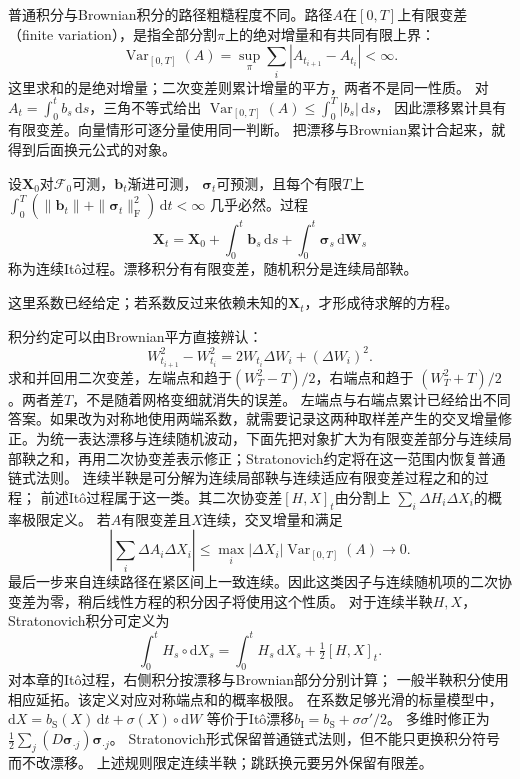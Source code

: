 普通积分与Brownian积分的路径粗糙程度不同。路径$A$在$[0,T]$上有限变差
（finite variation），是指全部分割$\pi$上的绝对增量和有共同有限上界：
\[
 \operatorname{Var}_{[0,T]}(A)
 =\sup_\pi\sum_i|A_{t_{i+1}}-A_{t_i}|<\infty.
\]
这里求和的是绝对增量；二次变差则累计增量的平方，两者不是同一性质。
对$A_t=\int_0^t b_s\,\mathrm ds$，三角不等式给出
$\operatorname{Var}_{[0,T]}(A)\leq\int_0^T|b_s|\,\mathrm ds$，
因此漂移累计具有有限变差。向量情形可逐分量使用同一判断。
把漂移与Brownian累计合起来，就得到后面换元公式的对象。
\begin{definition}[连续Itô过程]
  \label{def:action-state-ito-process}
  设$\bm X_0$对$\mathcal F_0$可测，$\bm b_t$渐进可测，
  $\bm\sigma_t$可预测，且每个有限$T$上
  $\int_0^T(\|\bm b_t\|+\|\bm\sigma_t\|_{\mathrm F}^2)\,\mathrm dt<\infty$
  几乎必然。过程
  \[
    \bm X_t=\bm X_0+\int_0^t\bm b_s\,\mathrm ds
                         +\int_0^t\bm\sigma_s\,\mathrm d\bm W_s
  \]
  称为连续Itô过程。漂移积分有有限变差，随机积分是连续局部鞅。
\end{definition}
这里系数已经给定；若系数反过来依赖未知的$\bm X_t$，才形成待求解的方程。

积分约定可以由Brownian平方直接辨认：
\[
 W_{t_{i+1}}^2-W_{t_i}^2
     =2W_{t_i}\Delta W_i+(\Delta W_i)^2.
\]
求和并回用二次变差，左端点和趋于$(W_T^2-T)/2$，右端点和趋于
$(W_T^2+T)/2$。两者差$T$，不是随着网格变细就消失的误差。
左端点与右端点累计已经给出不同答案。如果改为对称地使用两端系数，就需要记录这两种取样差产生的交叉增量修正。为统一表达漂移与连续随机波动，下面先把对象扩大为有限变差部分与连续局部鞅之和，再用二次协变差表示修正；Stratonovich约定将在这一范围内恢复普通链式法则。
连续半鞅是可分解为连续局部鞅与连续适应有限变差过程之和的过程；
前述Itô过程属于这一类。其二次协变差$[H,X]_t$由分割上
$\sum_i\Delta H_i\Delta X_i$的概率极限定义。
若$A$有限变差且$X$连续，交叉增量和满足
\[
 \left|\sum_i\Delta A_i\Delta X_i\right|
 \leq\max_i|\Delta X_i|\operatorname{Var}_{[0,T]}(A)
 \longrightarrow0.
\]
最后一步来自连续路径在紧区间上一致连续。因此这类因子与连续随机项的二次协变差为零，稍后线性方程的积分因子将使用这个性质。
对于连续半鞅$H,X$，
Stratonovich积分可定义为
\[
  \int_0^t H_s\circ\mathrm dX_s
       =\int_0^t H_s\,\mathrm dX_s+\tfrac12[H,X]_t.
\]
对本章的Itô过程，右侧积分按漂移与Brownian部分分别计算；
一般半鞅积分使用相应延拓。该定义对应对称端点和的概率极限。
在系数足够光滑的标量模型中，
$\mathrm dX=b_{\mathrm S}(X)\,\mathrm dt+\sigma(X)\circ\mathrm dW$
等价于Itô漂移$b_{\mathrm I}=b_{\mathrm S}+\sigma\sigma'/2$。
多维时修正为$\frac12\sum_j(D\bm\sigma_{\cdot j})\bm\sigma_{\cdot j}$。
Stratonovich形式保留普通链式法则，但不能只更换积分符号而不改漂移。
上述规则限定连续半鞅；跳跃换元要另外保留有限差。

